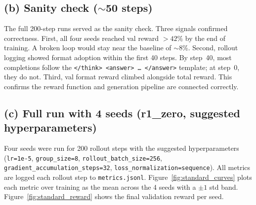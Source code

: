 \documentclass[11pt]{article}
\begin{document}
\subsection*{(b) Sanity check ($\sim$50 steps)}

The full 200-step runs served as the sanity check. Three signals confirmed
correctness. First, all four seeds reached val reward $>42\%$ by the end of
training. A broken loop would stay near
the baseline of $\sim$8\%. Second, rollout logging showed format adoption
within the first 40 steps. By step~40, most completions follow the
\texttt{</think>~<answer>~\ldots~</answer>} template; at step~0, they do not.
Third, val format reward climbed alongside total reward. This confirms the
reward function and generation pipeline are connected correctly.

\subsection*{(c) Full run with 4 seeds (r1\_zero, suggested hyperparameters)}

Four seeds were run for 200 rollout steps with the suggested hyperparameters
(\texttt{lr=1e-5}, \texttt{group\_size=8}, \texttt{rollout\_batch\_size=256},
\texttt{gradient\_accumulation\_steps=32}, \texttt{loss\_normalization=sequence}).
All metrics are logged each rollout step to \texttt{metrics.jsonl}.
Figure~\ref{fig:standard_curves} plots each metric over training as the mean
across the 4 seeds with a $\pm 1$ std band.
Figure~\ref{fig:standard_reward} shows the final validation reward per seed.
\end{document}
